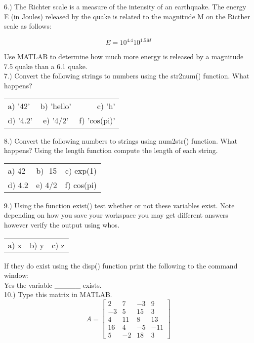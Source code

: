 6.) The Richter scale is a measure of the intensity of an
earthquake. The energy E (in Joules) released by the quake is related
to the magnitude M on the Ricther scale as follows:

\begin{equation} \nonumber
E = 10^{4.4}10^{1.5M}
\end{equation}

Use MATLAB to determine how much more energy is released by a magnitude 7.5 quake than a 6.1
quake. 
\ \\

7.) Convert the following strings to numbers using the str2num()
function. What happens?

\begin{center}
\begin{tabular}{l c r}
a) '42' & b) 'hello' & c) 'h' \\ d) '4.2' & e) '4/2' & f) 'cos(pi)'
\end{tabular}
\end{center}

8.) Convert the following numbers to strings using num2str()
function. What happens? Using the length function compute the length of
each string.

\begin{center}
\begin{tabular}{l c r}
a) 42 & b) -15 & c) exp(1) \\ d) 4.2 & e) 4/2 & f) cos(pi)
\end{tabular}
\end{center}

9.) Using the function exist() test whether or not these variables
exist. Note depending on how you save your workspace you may get
different answers however verify the output using whos.

\begin{center}
\begin{tabular}{l c r}
a) x & b) y & c) z
\end{tabular}
\end{center}

If they do exist using the disp() function print the following to the command
window:
\ \\

Yes the variable \_\_\_\_\_ exists.
\ \\

10.) Type this matrix in MATLAB.
\ \\
\begin{equation} \nonumber
A = \begin{bmatrix} 2 & 7 & -3 & 9 \\ -3 & 5 & 15 & 3 \\ 4 & 11 & 8 &
  13 \\ 16 & 4 & -5 & -11
  \\ 5 &-2 &18 &3 \end{bmatrix}
\end{equation}

